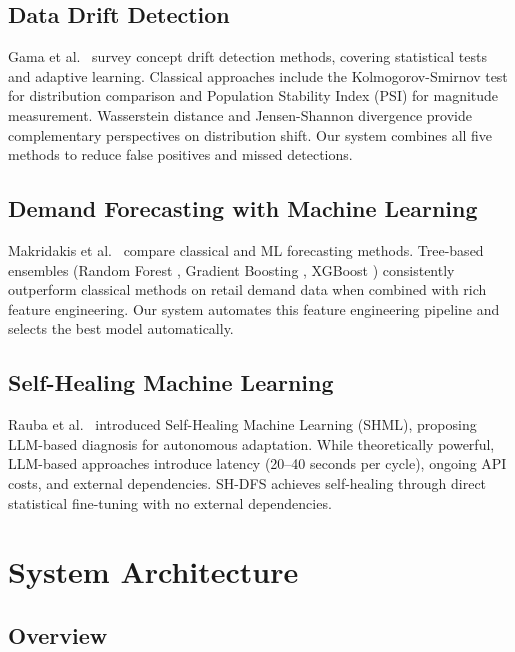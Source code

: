\documentclass[conference]{IEEEtran}
\begin{document}
\subsection{Data Drift Detection}

Gama et al.\ \cite{gama2014survey} survey concept drift detection methods, covering statistical tests and adaptive learning. Classical approaches include the Kolmogorov-Smirnov test for distribution comparison and Population Stability Index (PSI) for magnitude measurement. Wasserstein distance \cite{villani2009optimal} and Jensen-Shannon divergence provide complementary perspectives on distribution shift. Our system combines all five methods to reduce false positives and missed detections.

\subsection{Demand Forecasting with Machine Learning}

Makridakis et al.\ \cite{makridakis2018statistical} compare classical and ML forecasting methods. Tree-based ensembles (Random Forest \cite{breiman2001random}, Gradient Boosting \cite{friedman2001greedy}, XGBoost \cite{chen2016xgboost}) consistently outperform classical methods on retail demand data when combined with rich feature engineering. Our system automates this feature engineering pipeline and selects the best model automatically.

\subsection{Self-Healing Machine Learning}

Rauba et al.\ \cite{rauba2024self} introduced Self-Healing Machine Learning (SHML), proposing LLM-based diagnosis for autonomous adaptation. While theoretically powerful, LLM-based approaches introduce latency (20--40 seconds per cycle), ongoing API costs, and external dependencies. SH-DFS achieves self-healing through direct statistical fine-tuning with no external dependencies.

\section{System Architecture}

\subsection{Overview}
\end{document}
